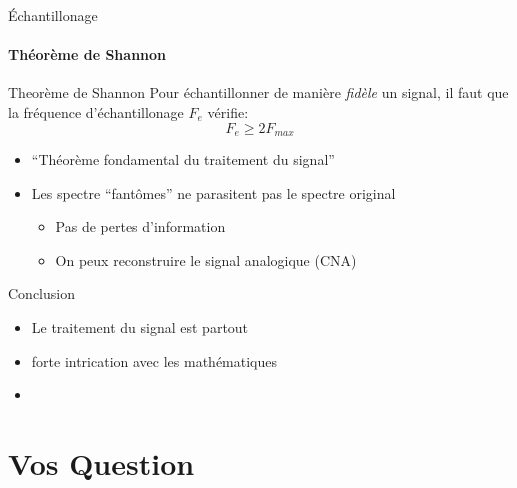 \documentclass{beamer}
\begin{document}
\begin{frame}{Échantillonage}
  \framesubtitle{Théorème de Shannon}

  \begin{alertblock}{Theorème de Shannon}
    Pour échantillonner de manière \emph{fidèle} un signal, il faut que la fréquence d'échantillonage $F_{e}$ vérifie:
    \[
      F_{e}\ge 2 F_{max}
    \]
  \end{alertblock}\pause
  \begin{itemize}
    \item ``Théorème fondamental du traitement du signal''
    \item Les spectre ``fantômes'' ne parasitent pas le spectre original
    \begin{itemize}
      \item Pas de pertes d'information
      \item On peux reconstruire le signal analogique (CNA)
    \end{itemize}
  \end{itemize}
\end{frame}
\begin{frame}{Conclusion}
  \begin{itemize}
    \item Le traitement du signal est partout
    \item forte intrication avec les mathématiques
    \item
  \end{itemize}
\end{frame}



\section{Vos Question}
\end{document}
